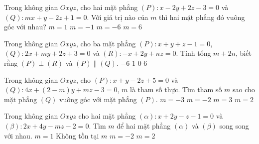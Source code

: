 \begin{ex}%
	Trong không gian $Oxyz$, cho hai mặt phẳng $(P)\colon x-2y+2z-3=0$ và $(Q)\colon mx+y-2z+1=0$. Với giá trị nào của $m$ thì hai mặt phẳng đó vuông góc với nhau?
	\choice
	{$m=1$}
	{$m=-1$}
	{$m=-6$}
	{\True $m=6$}
\end{ex}

\begin{ex}%
	Trong không gian $Oxyz$, cho ba mặt phẳng $(P)\colon x+y+z-1=0$, $(Q)\colon 2x+my+2z+3=0$ và $(R)\colon -x+2y+nz=0$. Tính tổng $m+2n$, biết rằng $(P)\perp (R)$ và $(P)\parallel (Q)$.
	\choice
	{$-6$}
	{$1$}
	{\True $0$}
	{$6$}
\end{ex}

\begin{ex}%
	Trong không gian $Oxyz$, cho $(P)\colon x+y-2z+5=0$ và $(Q)\colon 4x+(2-m)y+mz-3=0$, $m$ là tham số thực. Tìm tham số $m$ sao cho mặt phẳng $(Q)$ vuông góc với mặt phẳng $(P)$.
	\choice
	{$m=-3$}
	{$m=-2$}
	{$m=3$}
	{\True $m=2$}
\end{ex}

\begin{ex}%
	Trong không gian $Oxyz$ cho hai mặt phẳng $(\alpha)\colon x+2y-z-1=0$ và $(\beta)\colon 2x+4y-mz-2=0$. Tìm $m$ để hai mặt phẳng $(\alpha)$ và $(\beta)$ song song với nhau.
	\choice
	{$m=1$}
	{\True Không tồn tại $m$}
	{$m=-2$}
	{$m=2$}
\end{ex}

